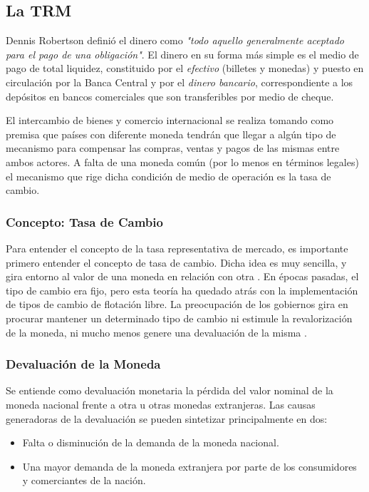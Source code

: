 \subsection{La TRM}
Dennis Robertson \cite{robertson} definió el dinero como \textit{"todo aquello generalmente aceptado para el pago de una obligación"}. El dinero en su forma más simple es el medio de pago de total liquidez, constituido por el \textit{efectivo} (billetes y monedas) y puesto en circulación por la Banca Central y por el \textit{dinero bancario}, correspondiente a los depósitos en bancos comerciales que son transferibles por medio de cheque. 

El intercambio de bienes y comercio internacional se realiza tomando como premisa que países con diferente moneda tendrán que llegar a algún tipo de mecanismo para compensar las compras, ventas y pagos de las mismas entre ambos actores. A falta de una moneda común (por lo menos en términos legales) el mecanismo que rige dicha condición de medio de operación es la tasa de cambio.

\subsubsection{Concepto: Tasa de Cambio}
Para entender el concepto de la tasa representativa de mercado, es importante primero entender el concepto de tasa de cambio. Dicha idea es muy sencilla, y gira entorno al valor de una moneda en relación con otra \cite{30seconds}. En épocas pasadas, el tipo de cambio era fijo, pero esta teoría ha quedado atrás con la implementación de tipos de cambio de flotación libre. La preocupación de los gobiernos gira en procurar mantener un determinado tipo de cambio ni estimule la revalorización de la moneda, ni mucho menos genere una devaluación de la misma \cite{cardenas}. 

\subsubsection{Devaluación de la Moneda} 
Se entiende como devaluación monetaria la pérdida del valor nominal de la moneda nacional frente a otra u otras monedas extranjeras. Las causas generadoras de la devaluación se pueden sintetizar principalmente en dos:

\begin{itemize}
	\item Falta o disminución de la demanda de la moneda nacional.
	\item Una mayor demanda de la moneda extranjera por parte de los consumidores y comerciantes de la nación.
\end{itemize}

